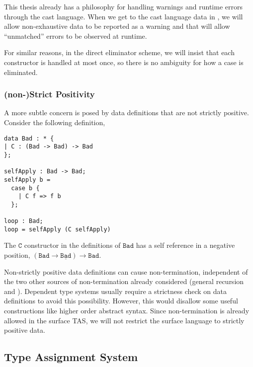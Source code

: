 
This thesis already has a philosophy for handling warnings and runtime errors through the cast language.
When we get to the cast language data in , we will allow non-exhaustive data to be reported as a warning and that will allow ``unmatched'' errors to be observed at runtime.

For similar reasons, in the direct eliminator scheme, we will insist that each constructor is handled at most once, so there is no ambiguity for how a case is eliminated.

\subsubsection{(non-)Strict Positivity}

A more subtle concern is posed by data definitions that are not strictly positive.
Consider the following definition, 

\begin{lstlisting}[basicstyle={\ttfamily\small}]
data Bad : * {
| C : (Bad -> Bad) -> Bad
};

selfApply : Bad -> Bad;
selfApply b =
  case b {
    | C f => f b
  };

loop : Bad;
loop = selfApply (C selfApply)
\end{lstlisting}

The $\mathtt{C}$ constructor in the definitions of $\mathtt{Bad}$ has a self reference in a negative position, $(\mathtt{Bad}\rightarrow\underline{\mathtt{Bad}})\rightarrow\mathtt{Bad}$. 

Non-strictly positive data definitions can cause non-termination, independent of the two other sources of non-termination already considered (general recursion and \tit{}).
Dependent type systems usually require a strictness check on data definitions to avoid this possibility.
However, this would disallow some useful constructions like higher order abstract syntax. %
Since non-termination is already allowed in the surface \ac{TAS}, we will not restrict the surface language to strictly positive data.



\subsection{Type Assignment System}

